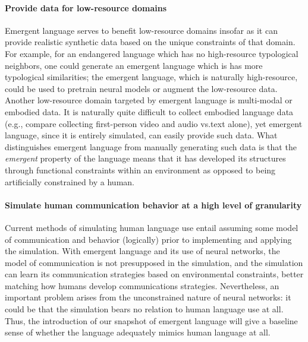 \paragraph{Provide data for low-resource domains}
Emergent language serves to benefit low-resource domains insofar as it can provide realistic synthetic data based on the unique constraints of that domain.
For example, for an endangered language which has no high-resource typological neighbors, one could generate an emergent language which is has more typological similarities; the emergent language, which is naturally high-resource, could be used to pretrain neural models or augment the low-resource data.
Another low-resource domain targeted by emergent language is multi-modal or embodied data.
It is naturally quite difficult to collect embodied language data (e.g., compare collecting first-person video and audio vs.\@ text alone), yet emergent language, since it is entirely simulated, can easily provide such data.
What distinguishes emergent language from manually generating such data is that the \emph{emergent} property of the language means that it has developed its structures through functional constraints within an environment as opposed to being artificially constrained by a human.

\paragraph{Simulate human communication behavior at a high level of granularity}
Current methods of simulating human language use entail assuming some model of communication and behavior (logically) prior to implementing and applying the simulation.
With emergent language and its use of neural networks, the model of communication is not presupposed in the simulation, and the simulation can learn its communication strategies based on environmental constraints, better matching how humans develop communications strategies.
Nevertheless, an important problem arises from the unconstrained nature of neural networks: it could be that the simulation bears no relation to human language use at all.
Thus, the introduction of our snapshot of emergent language will give a baseline sense of whether the language adequately mimics human language at all.

